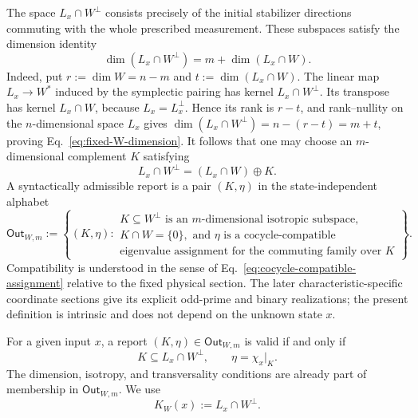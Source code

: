 \documentclass[11pt]{article}
\newcommand{\1}{\mathbf 1}
\theoremstyle{plain}
\theoremstyle{definition}
\theoremstyle{remark}
\begin{document}
The space $L_x\cap W^\perp$ consists precisely of the initial stabilizer
directions commuting with the whole prescribed measurement.  These subspaces
satisfy the dimension identity
\begin{equation}
 \dim(L_x\cap W^\perp)=m+\dim(L_x\cap W).
 \label{eq:fixed-W-dimension}
\end{equation}
Indeed, put $r:=\dim W=n-m$ and $t:=\dim(L_x\cap W)$.  The linear map
$L_x\to W^*$ induced by the symplectic pairing has kernel
$L_x\cap W^\perp$.  Its transpose has kernel $L_x\cap W$, because
$L_x=L_x^\perp$.  Hence its rank is $r-t$, and rank--nullity on the
$n$-dimensional space $L_x$ gives
$\dim(L_x\cap W^\perp)=n-(r-t)=m+t$, proving
Eq.~\eqref{eq:fixed-W-dimension}.  It follows that one may choose an
$m$-dimensional complement $K$ satisfying
\begin{equation}
 L_x\cap W^\perp=(L_x\cap W)\oplus K.
 \label{eq:fixed-W-direct-complement}
\end{equation}
A syntactically admissible report is a pair $(K,\eta)$ in the
state-independent alphabet
\begin{equation}
 \mathsf{Out}_{W,m}:=
 \left\{(K,\eta):
 \begin{array}{l}
 K\subseteq W^\perp\text{ is an }m\text{-dimensional isotropic subspace},\\
 K\cap W=\{0\},\text{ and }\eta\text{ is a cocycle-compatible}\\
 \text{eigenvalue assignment for the commuting family over }K
 \end{array}
 \right\}.
 \label{eq:fixed-W-output-alphabet}
\end{equation}
Compatibility is understood in the sense of
Eq.~\eqref{eq:cocycle-compatible-assignment} relative to the fixed physical
section.  The later characteristic-specific coordinate sections give its
explicit odd-prime and binary realizations; the present definition is
intrinsic and does not depend on the unknown state $x$.

For a given input $x$, a report $(K,\eta)\in\mathsf{Out}_{W,m}$ is valid if and
only if
\begin{equation}
 K\subseteq L_x\cap W^\perp,
 \qquad \eta=\chi_x|_K.
 \label{eq:fixed-W-valid-output}
\end{equation}
The dimension, isotropy, and transversality conditions are already part of
membership in $\mathsf{Out}_{W,m}$.  We use
\begin{equation}
 K_W(x):=L_x\cap W^\perp.
 \label{eq:fixed-W-K}
\end{equation}
\end{document}
